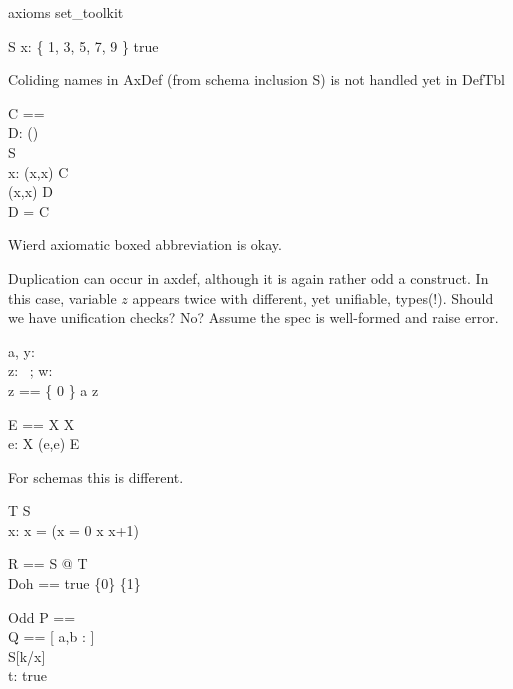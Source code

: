 \documentclass{article}
\begin{document}
\begin{zsection}
\SECTION axioms \parents set\_toolkit
\end{zsection}

\begin{schema}{S}
   x: \{ 1, 3, 5, 7, 9 \}
\where
   true
\end{schema}

Coliding names in AxDef (from schema inclusion S) is not handled yet in DefTbl
\begin{axdef}
   C == \nat \cross \nat \\
   D: \power(\nat \cross \nat) \\
   S \\
   x: \nat
\where
   (x,x) \in C \\
   (x,x) \in D \\
   D = C
\end{axdef}
Wierd axiomatic boxed abbreviation is okay.

Duplication can occur in axdef, although it is again rather odd a construct.
In this case, variable $z$ appears twice with different, yet unifiable, types(!).
Should we have unification checks? No? Assume the spec is well-formed and raise error.
\begin{axdef}
   a, y: \nat \\
   z: \power~\nat; w: \nat \cross \nat \\
   z == \{ 0 \}
\where
   a \in z
\end{axdef}

\begin{gendef}[X]
   E == X \cross X \\
   e: X
\where
   (e,e) \in E
\end{gendef}

For schemas this is different.
\begin{schema}{T}
   S \\
   x: \nat
 \where
    x = (\IF x = 0 \THEN x \ELSE x+1)
\end{schema}

\begin{zed}
   R == \forall S @ T
   \\
   Doh == \IF true \THEN \{0\} \ELSE \{1\}
\end{zed}

\begin{schema}{Odd}
   P == \nat \cross \nat \\
   Q == [ a,b : \nat ] \\
   S[k/x] \\
   t: \nat
\where 
   true
\end{schema}
\end{document}
